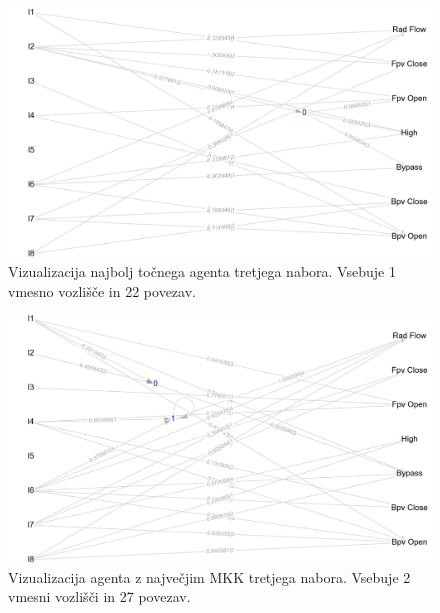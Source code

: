 \begin{figure}[H]
    \begin{center}
        \includegraphics[width=13cm]{shuttle/3/acc_g}
    \end{center}
    \caption{Vizualizacija najbolj točnega agenta tretjega nabora. Vsebuje 1 vmesno vozlišče in 22 povezav.}
    \label{fig:statlog_acc_3_g}
\end{figure}

\begin{figure}[H]
    \begin{center}
        \includegraphics[width=13cm]{shuttle/3/mcc_g}
    \end{center}
    \caption{Vizualizacija agenta z največjim MKK tretjega nabora. Vsebuje 2 vmesni vozlišči in 27 povezav.}
    \label{fig:statlog_mcc_3_g}
\end{figure}